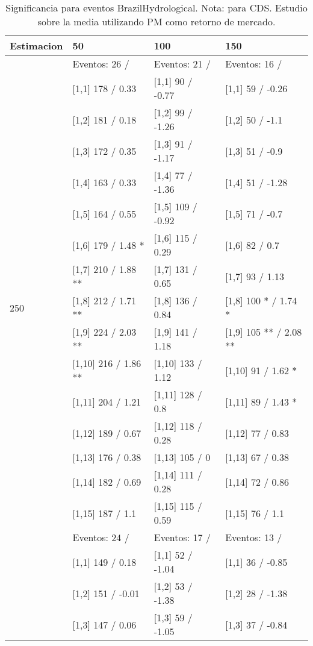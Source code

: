 \begin{table}

\caption{Significancia para eventos BrazilHydrological. Nota: para CDS. Estudio sobre la media utilizando PM como retorno de mercado.}
\centering
\begin{tabular}[t]{llll}
\toprule
Estimacion & 50 & 100 & 150\\
\midrule
 & Eventos:  26 / & Eventos:  21 / & Eventos:  16 /\\
 & {}[1,1] 178  / 0.33 & {}[1,1] 90  / -0.77 & {}[1,1] 59  / -0.26\\
 & {}[1,2] 181  / 0.18 & {}[1,2] 99  / -1.26 & {}[1,2] 50  / -1.1\\
 & {}[1,3] 172  / 0.35 & {}[1,3] 91  / -1.17 & {}[1,3] 51  / -0.9\\
 & {}[1,4] 163  / 0.33 & {}[1,4] 77  / -1.36 & {}[1,4] 51  / -1.28\\
\addlinespace
 & {}[1,5] 164  / 0.55 & {}[1,5] 109  / -0.92 & {}[1,5] 71  / -0.7\\
 & {}[1,6] 179  / 1.48 * & {}[1,6] 115  / 0.29 & {}[1,6] 82  / 0.7\\
 & {}[1,7] 210  / 1.88 ** & {}[1,7] 131  / 0.65 & {}[1,7] 93  / 1.13\\
250 & {}[1,8] 212  / 1.71 ** & {}[1,8] 136  / 0.84 & {}[1,8] 100 * / 1.74 *\\
 & {}[1,9] 224  / 2.03 ** & {}[1,9] 141  / 1.18 & {}[1,9] 105 ** / 2.08 **\\
\addlinespace
 & {}[1,10] 216  / 1.86 ** & {}[1,10] 133  / 1.12 & {}[1,10] 91  / 1.62 *\\
 & {}[1,11] 204  / 1.21 & {}[1,11] 128  / 0.8 & {}[1,11] 89  / 1.43 *\\
 & {}[1,12] 189  / 0.67 & {}[1,12] 118  / 0.28 & {}[1,12] 77  / 0.83\\
 & {}[1,13] 176  / 0.38 & {}[1,13] 105  / 0 & {}[1,13] 67  / 0.38\\
 & {}[1,14] 182  / 0.69 & {}[1,14] 111  / 0.28 & {}[1,14] 72  / 0.86\\
\addlinespace
 & {}[1,15] 187  / 1.1 & {}[1,15] 115  / 0.59 & {}[1,15] 76  / 1.1\\
 & Eventos:  24 / & Eventos:  17 / & Eventos:  13 /\\
 & {}[1,1] 149  / 0.18 & {}[1,1] 52  / -1.04 & {}[1,1] 36  / -0.85\\
 & {}[1,2] 151  / -0.01 & {}[1,2] 53  / -1.38 & {}[1,2] 28  / -1.38\\
 & {}[1,3] 147  / 0.06 & {}[1,3] 59  / -1.05 & {}[1,3] 37  / -0.84\\

\end{tabular}
\end{table}
